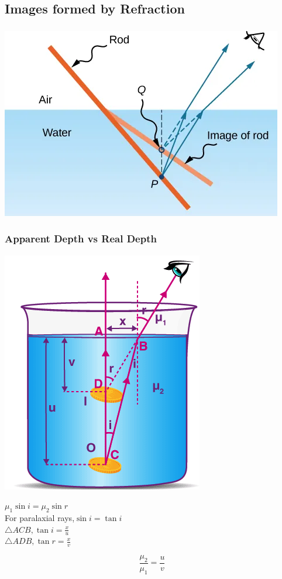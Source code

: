 \documentclass{beamer}
\begin{document}
\subsection{Images formed by Refraction}
\begin{frame}
	\frametitle{}
	\begin{center}
		\includegraphics[scale=0.3]{51.png}
	\end{center}

\end{frame}
\begin{frame}
	\frametitle{Apparent Depth vs Real Depth}
	\begin{center}
	\includegraphics[scale=0.2]{52.png}

	$ \mu_{1} \sin i = \mu_{2} \sin r $ \\
	For paralaxial rays,$\sin i = \tan i $ \\
	$\triangle ACB, \tan i = \frac{x}{u}$ \\
	$\triangle ADB, \tan r = \frac{x}{v}$  \\
	\end{center}
	\begin{block}{}
		\begin{displaymath}
			\frac{\mu_{2}}{\mu_{1}} = \frac{u}{v}
		\end{displaymath}
	\end{block}
\end{frame}
\end{document}
